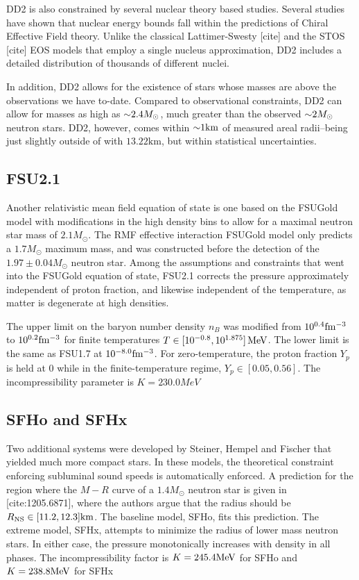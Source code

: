 DD2 is also constrained by several nuclear theory based studies.
Several studies have shown that nuclear energy bounds fall within the predictions of Chiral Effective Field theory.
Unlike the classical Lattimer-Swesty [cite] and the STOS [cite] EOS models that employ a single nucleus approximation, DD2 includes a detailed distribution of thousands of different nuclei.

In addition, DD2 allows for the existence of stars whose masses are above the observations we have to-date.
Compared to observational constraints, DD2 can allow for masses as high as $\mathord{\sim} 2.4 M_\odot$, much greater than the observed $\mathord{\sim} 2 M_\odot$ neutron stars.
DD2, however, comes within $\mathord{\sim} 1 \textrm{km}$ of measured areal radii--being just slightly outside of with $13.22 \textrm{km}$, but within statistical uncertainties.

\subsection{FSU2.1}
\label{sec:fsu21}

Another relativistic mean field equation of state is one based on the FSUGold model with modifications in the high density bins to allow for a maximal neutron star mass of $2.1 M_\odot$.  The RMF effective interaction FSUGold model only predicts a $1.7 M_\odot$ maximum mass, and was constructed before the detection of the $1.97 \pm 0.04 M_\odot$ neutron star.
Among the assumptions and constraints that went into the FSUGold equation of state, FSU2.1 corrects the pressure approximately independent of proton fraction, and likewise independent of the temperature, as matter is degenerate at high densities.

The upper limit on the baryon number density $n_B$ was modified from $10^{0.4} {\rm fm^{-3}}$ to $10^{0.2} {\rm fm^{-3}}$ for finite temperatures $T \in [10^{-0.8} , 10^{1.875}]\, {\rm MeV}$.  The lower limit is the same as FSU1.7 at $10^{-8.0} {\rm fm^{-3}}$.  For zero-temperature, the proton fraction $Y_p$ is held at $0$ while in the finite-temperature regime, $Y_p \in [0.05 , 0.56]$.  The incompressibility parameter is $K = 230.0 MeV$

\subsection{SFHo and SFHx}
\label{sec:sfh}

Two additional systems were developed by Steiner, Hempel and Fischer that yielded much more compact stars.  In these models, the theoretical constraint enforcing subluminal sound speeds is automatically enforced.  A prediction for the region where the $M-R$ curve of a $1.4 M_\odot$  neutron star is given in [cite:1205.6871], where the authors argue that the radius should be $R_{\rm NS} \in [11.2,12.3] {\rm km}$.  The baseline model, SFHo, fits this prediction.  The extreme model, SFHx, attempts to minimize the radius of lower mass neutron stars.  In either case, the pressure monotonically increases with density in all phases.
The incompressibility factor is $K = 245.4 {\rm MeV}$ for SFHo and $K = 238.8 {\rm MeV}$ for SFHx

